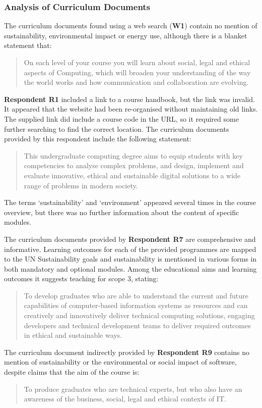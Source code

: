 \subsubsection*{Analysis of Curriculum Documents}

The curriculum documents found using a web search (\textbf{W1}) contain no mention of sustainability, environmental impact or energy use, although there is a blanket statement that:
\begin{quote}
    On each level of your course you will learn about social, legal and ethical aspects of Computing, which will broaden your understanding of the way the world works and how communication and collaboration are evolving.
\end{quote}

\textbf{Respondent R1} included a link to a course handbook, but the link was invalid. It appeared that the website had been re-organised without maintaining old links. The supplied link did include a course code in the URL, so it required some further searching to find the correct location. The curriculum documents provided by this respondent include the following statement:
\begin{quote}
    This undergraduate computing degree aims to equip students with key competencies to analyse complex problems, and design, implement and evaluate innovative, ethical and sustainable digital solutions to a wide range of problems in modern society.
\end{quote}
The terms `sustainability' and `environment' appeared several times in the course overview, but there was no further information about the content of specific modules.

The curriculum documents provided by \textbf{Respondent R7} are comprehensive and informative. Learning outcomes for each of the provided programmes are mapped to the UN Sustainability goals and sustainability is mentioned in various forms in both mandatory and optional modules. Among the educational aims and learning outcomes it suggests teaching for scope 3, stating:
\begin{quote}
    To develop graduates who are able to understand the current and future capabilities of computer-based information systems as resources and can creatively and innovatively deliver technical computing solutions, engaging developers and technical development teams to deliver required outcomes in ethical and sustainable ways.
\end{quote}

The curriculum document indirectly provided by \textbf{Respondent R9} contains no mention of sustainability or the environmental or social impact of software, despite claims that the aim of the course is:
\begin{quote}
To produce graduates who are technical experts, but who also have an
awareness of the business, social, legal and ethical contexts of IT.
\end{quote}

